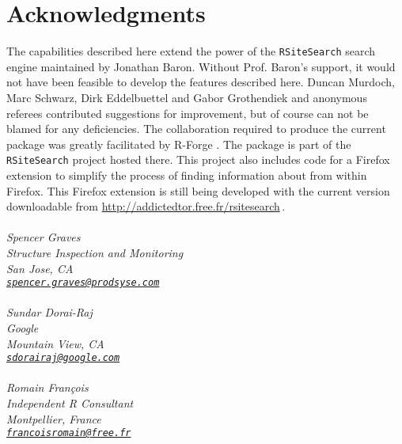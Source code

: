 \section{Acknowledgments}
The capabilities described here extend the power of the
{\tt RSiteSearch} search engine maintained by Jonathan Baron.
Without Prof. Baron's support, it would not have been feasible
to develop the features described here. Duncan Murdoch, Marc Schwarz,
Dirk Eddelbuettel and Gabor Grothendiek and anonymous
referees contributed suggestions for improvement, but of course
can not be blamed for any deficiencies.  The collaboration
required to produce the current  package was greatly
facilitated by R-Forge \citep{RFORGE09URL}. The  package
is part of the {\tt RSiteSearch} project hosted there.  This project
also includes code for a Firefox extension to simplify the process of
finding information about \R{} from within Firefox.  This Firefox
extension is still being developed with the current version
downloadable from \url{http://addictedtor.free.fr/rsitesearch}\,.
\\ \\
\emph{Spencer Graves \\
Structure Inspection and Monitoring \\
San Jose, CA \\
{\tt\href{mailto:spencer.graves@prodsyse.com}{spencer.graves@prodsyse.com}} }
\\ \\
\emph{Sundar Dorai-Raj \\
Google \\
Mountain View, CA \\
{\tt\href{mailto:sdorairaj@google.com}{sdorairaj@google.com}} }
\\ \\
\emph{Romain Fran{\c c}ois \\
Independent R Consultant \\
Montpellier, France \\
{\tt\href{mailto:francoisromain@free.fr}{francoisromain@free.fr}} }
